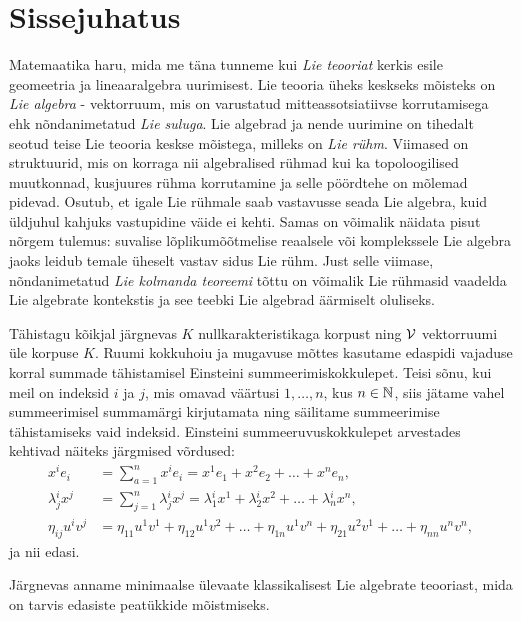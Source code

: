 
\section{Sissejuhatus}

Matemaatika haru, mida me täna tunneme kui \emph{Lie teooriat} kerkis esile
geomeetria ja lineaaralgebra uurimisest. Lie teooria üheks keskseks mõisteks
on \emph{Lie algebra} - vektorruum, mis on varustatud
mitteassotsiatiivse korrutamisega ehk nõndanimetatud \emph{Lie suluga}.
Lie algebrad ja nende uurimine on tihedalt seotud teise Lie teooria keskse
mõistega, milleks on \emph{Lie rühm}. Viimased on
struktuurid, mis on korraga nii algebralised rühmad kui ka topoloogilised
muutkonnad, kusjuures rühma korrutamine ja selle pöördtehe on mõlemad
pidevad. Osutub, et igale Lie rühmale saab vastavusse seada Lie algebra, kuid
üldjuhul kahjuks vastupidine väide ei kehti. Samas on võimalik näidata
pisut nõrgem tulemus: suvalise lõplikumõõtmelise
reaalsele või komplekssele Lie algebra jaoks leidub temale üheselt
vastav sidus Lie rühm.\cite{kirillov2008introduction} Just selle viimase,
nõndanimetatud \emph{Lie kolmanda teoreemi} tõttu on võimalik
Lie rühmasid vaadelda Lie algebrate kontekstis ja see teebki Lie algebrad
äärmiselt oluliseks.

Tähistagu kõikjal järgnevas $K$ nullkarakteristikaga korpust ning $\mathcal{V}$
vektorruumi üle korpuse $K$. Ruumi kokkuhoiu ja mugavuse mõttes
kasutame edaspidi vajaduse korral summade tähistamisel
Einsteini summeerimiskokkulepet. Teisi sõnu, kui meil on indeksid $i$ ja $j$,
mis omavad väärtusi $1, \dots, n$, kus $n \in \mathbb{N}$, siis jätame vahel
summeerimisel summamärgi kirjutamata ning säilitame summeerimise tähistamiseks
vaid indeksid. Einsteini summeeruvuskokkulepet arvestades kehtivad näiteks
järgmised võrdused:
\begin{align*}
    x^{i} e_{i} &= \sum_{a=1}^{n} x^{i} e_{i} = 
        x^{1} e_{1} + x^{2} e_{2} + \dots + x^{n} e_{n}, \\
    \lambda{^i_j} x^{j} &= \sum_{j=1}^{n} 
        \lambda{^i_j} x^{j} = \lambda{^i_1} x^{1} + 
        \lambda{^i_2} x^{2} + 
        \dots +\lambda{^i_n} x^{n},\\
    \eta_{ij} u^{i} v^{j} &= \eta_{11} u^{1} v^{1} + 
        \eta_{12} u^{1} v^{2} + \dots + \eta_{1n} u^{1} v^{n} + 
        \eta_{21} u^{2} v^{1} + \dots + \eta_{nn} u^{n} v^{n},
\end{align*}
ja nii edasi.

Järgnevas anname minimaalse ülevaate klassikalisest Lie algebrate teooriast,
mida on tarvis edasiste peatükkide mõistmiseks.